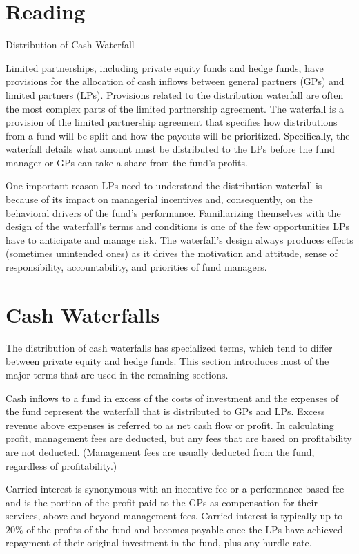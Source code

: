 \documentclass[11pt]{article}
\begin{document}
\section*{Reading}
Distribution of Cash Waterfall

Limited partnerships, including private equity funds and hedge funds, have provisions for the allocation of cash inflows between general partners (GPs) and limited partners (LPs). Provisions related to the distribution waterfall are often the most complex parts of the limited partnership agreement. The waterfall is a provision of the limited partnership agreement that specifies how distributions from a fund will be split and how the payouts will be prioritized. Specifically, the waterfall details what amount must be distributed to the LPs before the fund manager or GPs can take a share from the fund's profits.

One important reason LPs need to understand the distribution waterfall is because of its impact on managerial incentives and, consequently, on the behavioral drivers of the fund's performance. Familiarizing themselves with the design of the waterfall's terms and conditions is one of the few opportunities LPs have to anticipate and manage risk. The waterfall's design always produces effects (sometimes unintended ones) as it drives the motivation and attitude, sense of responsibility, accountability, and priorities of fund managers.

\section*{Cash Waterfalls}
The distribution of cash waterfalls has specialized terms, which tend to differ between private equity and hedge funds. This section introduces most of the major terms that are used in the remaining sections.

Cash inflows to a fund in excess of the costs of investment and the expenses of the fund represent the waterfall that is distributed to GPs and LPs. Excess revenue above expenses is referred to as net cash flow or profit. In calculating profit, management fees are deducted, but any fees that are based on profitability are not deducted. (Management fees are usually deducted from the fund, regardless of profitability.)

Carried interest is synonymous with an incentive fee or a performance-based fee and is the portion of the profit paid to the GPs as compensation for their services, above and beyond management fees. Carried interest is typically up to $20 \%$ of the profits of the fund and becomes payable once the LPs have achieved repayment of their original investment in the fund, plus any hurdle rate.
\end{document}
